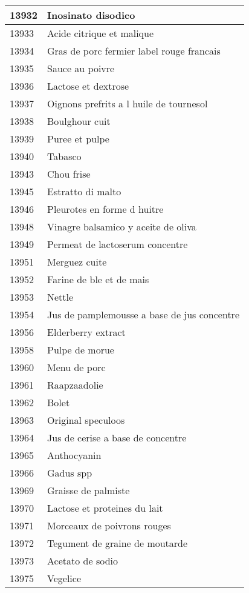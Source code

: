\begin{longtable}{|l|l|}
13932 & Inosinato disodico \\ \hline 
13933 & Acide citrique et malique \\ \hline 
13934 & Gras de porc fermier label rouge francais \\ \hline 
13935 & Sauce au poivre \\ \hline 
13936 & Lactose et dextrose \\ \hline 
13937 & Oignons prefrits a l huile de tournesol \\ \hline 
13938 & Boulghour cuit \\ \hline 
13939 & Puree et pulpe \\ \hline 
13940 & Tabasco \\ \hline 
13943 & Chou frise \\ \hline 
13945 & Estratto di malto \\ \hline 
13946 & Pleurotes en forme d huitre \\ \hline 
13948 & Vinagre balsamico y aceite de oliva \\ \hline 
13949 & Permeat de lactoserum concentre \\ \hline 
13951 & Merguez cuite \\ \hline 
13952 & Farine de ble et de mais \\ \hline 
13953 & Nettle \\ \hline 
13954 & Jus de pamplemousse a base de jus concentre \\ \hline 
13956 & Elderberry extract \\ \hline 
13958 & Pulpe de morue \\ \hline 
13960 & Menu de porc \\ \hline 
13961 & Raapzaadolie \\ \hline 
13962 & Bolet \\ \hline 
13963 & Original speculoos \\ \hline 
13964 & Jus de cerise a base de concentre \\ \hline 
13965 & Anthocyanin \\ \hline 
13966 & Gadus spp \\ \hline 
13969 & Graisse de palmiste \\ \hline 
13970 & Lactose et proteines du lait \\ \hline 
13971 & Morceaux de poivrons rouges \\ \hline 
13972 & Tegument de graine de moutarde \\ \hline 
13973 & Acetato de sodio \\ \hline 
13975 & Vegelice \\ \hline 

\end{longtable}
